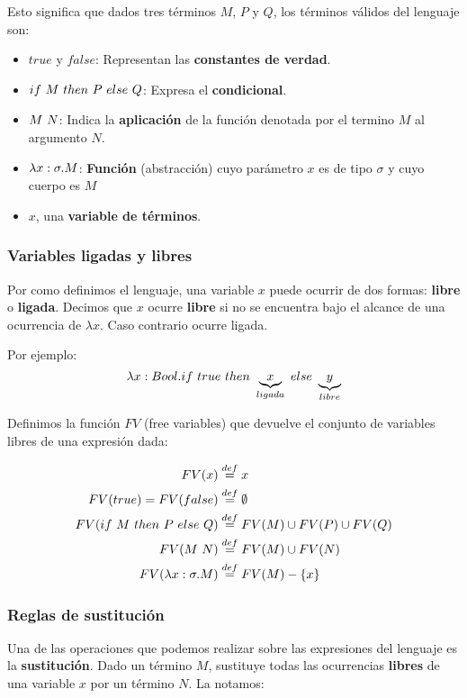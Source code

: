 Esto significa que dados tres términos $M$, $P$ y $Q$, los términos válidos del lenguaje son:
\begin{itemize}
	\item $true$ y $false$: Representan las \textbf{constantes de verdad}.
	\item $ if~ M~ then~ P~ else~ Q$: Expresa el \textbf{condicional}.
	\item $M~N$: Indica la \textbf{aplicación} de la función denotada por el termino $M$ al argumento $N$.
	\item $\lambda x: \sigma . M$: \textbf{Función} (abstracción) cuyo parámetro $x$ es de tipo $\sigma$ y cuyo cuerpo es $M$
	\item $x$, una \textbf{variable de términos}.
\end{itemize}

\subsubsection{Variables ligadas y libres}
Por como definimos el lenguaje, una variable $x$ puede ocurrir de dos formas: \textbf{libre} o \textbf{ligada}. Decimos que $x$ ocurre \textbf{libre} si no se encuentra bajo el alcance de una ocurrencia de $\lambda x$. Caso contrario ocurre ligada.

Por ejemplo:
$$\lambda x: Bool . if~ true~ then~ \underbrace{x}_{ligada}~ else~ \underbrace{y}_{libre} $$

Definimos la función $FV$ (free variables) que devuelve el conjunto de variables libres de una expresión dada:

\begin{equation*}
	\begin{split}
		FV(x) &\overset{def}{=} {x} \\
		FV(true) = FV(false) &\overset{def}{=} \emptyset \\
		FV(if~ M~ then~ P~ else~ Q) &\overset{def}{=} FV(M)\cup FV(P)\cup FV(Q) \\
		FV(M~N) &\overset{def}{=} FV(M)\cup FV(N) \\
		FV(\lambda x: \sigma . M) &\overset{def}{=} FV(M) - \{x\}
	\end{split}
\end{equation*}

\subsubsection{Reglas de sustitución}
Una de las operaciones que podemos realizar sobre las expresiones del lenguaje es la \textbf{sustitución}. Dado un término $M$, sustituye todas las ocurrencias \textbf{libres} de una variable $x$ por un término $N$. La notamos:

